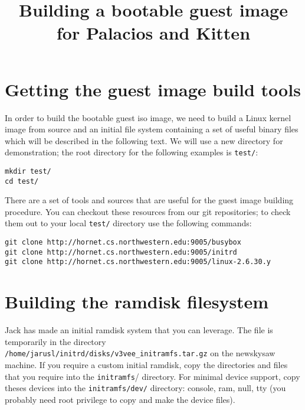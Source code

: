 \documentclass{article}[11pt]
\title{Building a bootable guest image for Palacios and Kitten}
\begin{document}
\maketitle

\section{Getting the guest image build tools}

In order to build the bootable guest iso image, we need to build a Linux kernel
image from source and an initial file system containing a set of useful binary
files which will be described in the following text. We will use a new directory
for demonstration; the root directory for the following examples is
\verb+test/+:

\begin{verbatim}
mkdir test/
cd test/
\end{verbatim}

\vspace{10pt}
\noindent
There are a set of tools and sources that are useful for the guest image
building procedure. You can checkout these resources from our git repositories;
to check them out to your local \verb+test/+ directory use the following
commands: 

\begin{verbatim}
git clone http://hornet.cs.northwestern.edu:9005/busybox
git clone http://hornet.cs.northwestern.edu:9005/initrd
git clone http://hornet.cs.northwestern.edu:9005/linux-2.6.30.y
\end{verbatim}

\section{Building the ramdisk filesystem}


Jack has made an initial ramdisk system that you can leverage. The file is
temporarily in the directory
\verb|/home/jarusl/initrd/disks/v3vee_initramfs.tar.gz| on the
newskysaw machine. If you require a custom initial ramdisk, copy the directories
and files that you require into the \verb+initramfs+/ directory. For minimal
device support, copy theses devices into the \verb+initramfs/dev/+ directory:
console, ram, null, tty (you probably need root privilege to copy and make the
device files).
\end{document}
